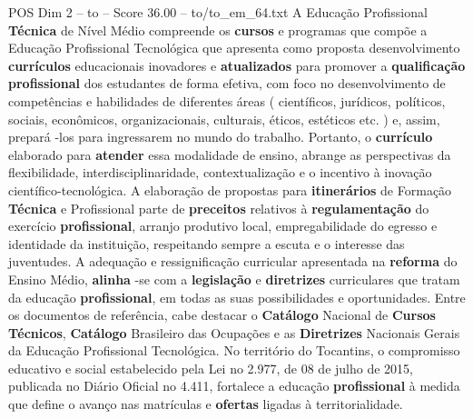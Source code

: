 \begin{textsample}{POS Dim 2 – to – Score 36.00 – to/to\_em\_64.txt}  \label{ex:f2_pos_131}
A Educação Profissional \textbf{Técnica} de Nível Médio compreende os \textbf{cursos} e programas que compõe a Educação Profissional Tecnológica que apresenta como proposta desenvolvimento \textbf{currículos} educacionais inovadores e \textbf{atualizados} para promover a \textbf{qualificação} \textbf{profissional} dos estudantes de forma efetiva, com foco no desenvolvimento de competências e habilidades de diferentes áreas ( científicos, jurídicos, políticos, sociais, econômicos, organizacionais, culturais, éticos, estéticos etc. ) e, assim, prepará -los para ingressarem no mundo do trabalho.
Portanto, o \textbf{currículo} elaborado para \textbf{atender} essa modalidade de ensino, abrange as perspectivas da flexibilidade, interdisciplinaridade, contextualização e o incentivo à inovação científico-tecnológica.
A elaboração de propostas para \textbf{itinerários} de Formação \textbf{Técnica} e Profissional parte de \textbf{preceitos} relativos à \textbf{regulamentação} do exercício \textbf{profissional}, arranjo produtivo local, empregabilidade do egresso e identidade da instituição, respeitando sempre a escuta e o interesse das juventudes.
A adequação e ressignificação curricular apresentada na \textbf{reforma} do Ensino Médio, \textbf{alinha} -se com a \textbf{legislação} e \textbf{diretrizes} curriculares que tratam da educação \textbf{profissional}, em todas as suas possibilidades e oportunidades.
Entre os documentos de referência, cabe destacar o \textbf{Catálogo} Nacional de \textbf{Cursos} \textbf{Técnicos}, \textbf{Catálogo} Brasileiro das Ocupações e as \textbf{Diretrizes} Nacionais Gerais da Educação Profissional Tecnológica.
No território do Tocantins, o compromisso educativo e social estabelecido pela Lei no 2.977, de 08 de julho de 2015, publicada no Diário Oficial no 4.411, fortalece a educação \textbf{profissional} à medida que define o avanço nas matrículas e \textbf{ofertas} ligadas à territorialidade.

\end{textsample}
